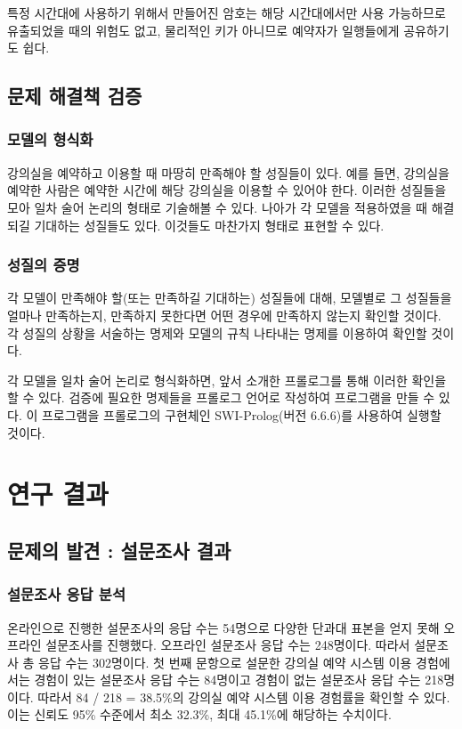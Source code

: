\documentclass[11pt,a4paper]{article}
\begin{document}
특정 시간대에 사용하기 위해서 만들어진 암호는 해당 시간대에서만 사용 가능하므로
유출되었을 때의 위험도 없고, 물리적인 키가 아니므로 예약자가 일행들에게
공유하기도 쉽다.

\subsection{문제 해결책 검증}

\subsubsection{모델의 형식화}
강의실을 예약하고 이용할 때 마땅히 만족해야 할 성질들이 있다. 예를 들면,
강의실을 예약한 사람은 예약한 시간에 해당 강의실을 이용할 수 있어야 한다.
이러한 성질들을 모아 일차 술어 논리의 형태로 기술해볼 수 있다. 나아가 각 모델을
적용하였을 때 해결되길 기대하는 성질들도 있다. 이것들도 마찬가지 형태로 표현할
수 있다.

\subsubsection{성질의 증명}
각 모델이 만족해야 할(또는 만족하길 기대하는) 성질들에 대해, 모델별로 그
성질들을 얼마나 만족하는지, 만족하지 못한다면 어떤 경우에 만족하지 않는지
확인할 것이다. 각 성질의 상황을 서술하는 명제와 모델의 규칙 나타내는 명제를
이용하여 확인할 것이다.

각 모델을 일차 술어 논리로 형식화하면, 앞서 소개한 프롤로그를 통해 이러한
확인을 할 수 있다. 검증에 필요한 명제들을 프롤로그 언어로 작성하여 프로그램을
만들 수 있다. 이 프로그램을 프롤로그의 구현체인 SWI-Prolog(버전 6.6.6)를
사용하여 실행할 것이다.

\section{연구 결과}

\subsection{문제의 발견 : 설문조사 결과}

\subsubsection{설문조사 응답 분석}
온라인으로 진행한 설문조사의 응답 수는 54명으로 다양한 단과대 표본을 얻지 못해
오프라인 설문조사를 진행했다. 오프라인 설문조사 응답 수는 248명이다. 따라서
설문조사 총 응답 수는 302명이다. 첫 번째 문항으로 설문한 강의실 예약 시스템
이용 경험에서는 경험이 있는 설문조사 응답 수는 84명이고 경험이 없는 설문조사
응답 수는 218명이다. 따라서 84 / 218 = 38.5\%의 강의실 예약 시스템 이용
경험률을 확인할 수 있다. 이는 신뢰도 95\% 수준에서 최소 32.3\%, 최대 45.1\%에
해당하는 수치이다.
\end{document}
